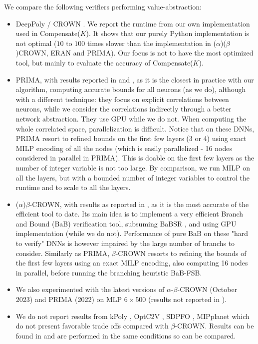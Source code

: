 \documentclass{llncs}
\begin{document}
We compare the following verifiers performing value-abstraction:
\begin{itemize}
	\item DeepPoly \cite{deeppoly}/ CROWN \cite{crown}. We report the runtime from our own implementation used in Compensate($K$). It shows that our purely Python implementation is not optimal ($10$ to $100$ times slower than the implementation in ($\alpha$)($\beta$)CROWN, ERAN and PRIMA). Our focus is not to have the most optimized tool, but mainly to evaluate the accuracy of Compensate($K$).
	\item PRIMA, with results reported in \cite{prima} and \cite{crown}, as it is the closest in practice with our algorithm, computing accurate bounds for all neurons (as we do), although with a different technique: they focus on explicit correlations between neurons, while we consider the correlations indirectly through a better network abstraction. They use GPU while we do not. When computing the whole correlated space, 
	parallelization is difficult.
	Notice that on these DNNs, PRIMA resort to refined bounds on the first few layers (3 or 4) using exact MILP encoding of all the nodes (which is easily parallelized - 16 nodes considered in parallel in PRIMA). This is doable on the first few layers as the number of integer variable is not too large. By comparison, we run MILP on all the layers, but with a bounded number of integer variables to control the runtime and to scale to all the layers.
	\item ($\alpha$)$\beta$-CROWN, with results as reported in \cite{crown}, as it is the most accurate of the efficient tool to date. Its main idea is to implement a very efficient Branch and Bound (BaB) verification tool, subsuming BaBSR \cite{BaB}, and using GPU implementation (while we do not). Performance of pure BaB on these 
	"hard to verify" DNNs is however impaired by the large number of branchs to consider. Similarly as PRIMA, $\beta$-CROWN resorts to refining the bounds of the first few layers using an exact MILP encoding, also computing 16 nodes in parallel, before running the branching heuristic BaB-FSB. 
	\item We also experimented with the latest versions of $\alpha$-$\beta$-CROWN (October 2023) and PRIMA (2022) on MLP $6 \times 500$ (results not reported in \cite{crown,prima}).
	\item We do not report results from kPoly \cite{kpoly}, OptC2V \cite{optC2V}, 
	SDPFO \cite{SDPFI}, MIPplanet \cite{MIPplanet} which do not present favorable trade offs compared with $\beta$-CROWN. Results can be found in \cite{crown} and are performed in the same conditions so can be compared.

\end{itemize}
\end{document}
